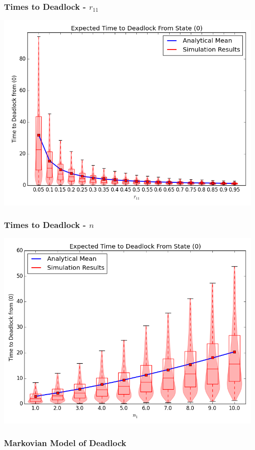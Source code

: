 \documentclass{beamer}
\begin{document}
\begin{frame}
    \frametitle{Times to Deadlock - $r_{11}$}
    \includegraphics[width=\textwidth]{varyr11_1node}
\end{frame}
\begin{frame}
    \frametitle{Times to Deadlock - $n$}
    \includegraphics[width=\textwidth]{varyn1_1node}
\end{frame}




\begin{frame}
    \frametitle{Markovian Model of Deadlock}
    \newline
\end{frame}
\end{document}
